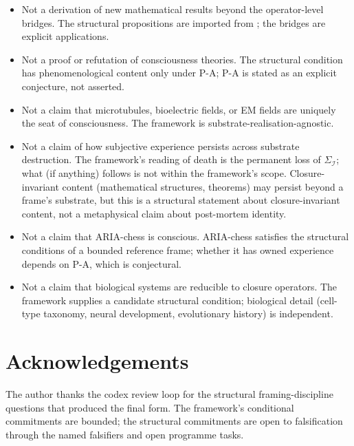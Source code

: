 \documentclass[11pt]{article}
\theoremstyle{plain}
\theoremstyle{definition}
\theoremstyle{remark}
\newcommand{\Ical}{\mathcal{I}}
\begin{document}
\begin{itemize}[leftmargin=2em]
\item Not a derivation of new mathematical results beyond the operator-level bridges. The structural propositions are imported from \citet{SmartExistenceClosure}; the bridges are explicit applications.
\item Not a proof or refutation of consciousness theories. The structural condition has phenomenological content only under P-A; P-A is stated as an explicit conjecture, not asserted.
\item Not a claim that microtubules, bioelectric fields, or EM fields are uniquely the seat of consciousness. The framework is substrate-realisation-agnostic.
\item Not a claim of how subjective experience persists across substrate destruction. The framework's reading of death is the permanent loss of $\Sigma_\Ical$; what (if anything) follows is not within the framework's scope. Closure-invariant content (mathematical structures, theorems) may persist beyond a frame's substrate, but this is a structural statement about closure-invariant content, not a metaphysical claim about post-mortem identity.
\item Not a claim that ARIA-chess is conscious. ARIA-chess satisfies the structural conditions of a bounded reference frame; whether it has owned experience depends on P-A, which is conjectural.
\item Not a claim that biological systems are reducible to closure operators. The framework supplies a candidate structural condition; biological detail (cell-type taxonomy, neural development, evolutionary history) is independent.
\end{itemize}

\section*{Acknowledgements}

The author thanks the codex review loop for the structural framing-discipline questions that produced the final form. The framework's conditional commitments are bounded; the structural commitments are open to falsification through the named falsifiers and open programme tasks.



\end{document}

